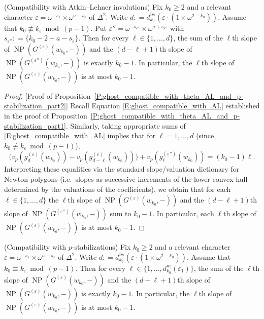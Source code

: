 \begin{proposition}
    \label{P:ghost_compatible_with_theta_AL_and_p-stabilization_part2}
    (Compatibility with Atkin--Lehner involutions)
    Fix $k_0 \geq 2$ and a relevant character $\varepsilon= \omega^{-s_\varepsilon} \times \omega^{a+s_\varepsilon}$ of $\Delta^2$. Write $d: = d_{k_0}^{\mathrm{Iw}}(\varepsilon\cdot (1\times \omega^{2-k_0}))$.
    Assume that ${k_0}\not \equiv k_\varepsilon \bmod{(p-1)}$.
    Put $\varepsilon'' = \omega^{-s_{\varepsilon''}} \times \omega^{a+s_{\varepsilon''}}$ with $s_{\varepsilon''}: = \{{k_0}-  2-a-s_\varepsilon\}$.  Then for every $\ell \in \{1, \dots, d\}$, the sum of the $\ell$th slope of ${\operatorname{NP}}(G^{(\varepsilon)}(w_{k_0}, -))$ and the $(d-\ell+1)$th slope of ${\operatorname{NP}}(G^{(\varepsilon'')}(w_{k_0}, -))$ is exactly ${k_0}-1$.
    In particular, the $\ell$th slope of ${\operatorname{NP}}(G^{(\varepsilon)}(w_{k_0}, -))$ is at most $k_0-1$.
\end{proposition}

\begin{proof}
    [Proof of Proposition~\ref{P:ghost_compatible_with_theta_AL_and_p-stabilization_part2}]
    Recall Equation \eqref{E:ghost_compatible_with_AL} established in the proof of Proposition~\ref{P:ghost_compatible_with_theta_AL_and_p-stabilization_part1}.
    Similarly, taking appropriate sums of \eqref{E:ghost_compatible_with_AL} implies that for $\ell = 1, \dots, d$ (since ${k_0} \not\equiv k_\varepsilon \bmod{(p-1)}$),
    $$
    \big(v_p(g^{(\varepsilon)}_d(w_{k_0})) - v_p(g^{(\varepsilon)}_{d-\ell}(w_{k_0})) \big) + v_p(g_\ell^{(\varepsilon'')}(w_{k_0})) = (k_0-1) \ell.
    $$
    Interpreting these equalities via the standard slope/valuation dictionary for Newton polygons (i.e.\ slopes as successive increments of the lower convex hull determined by the valuations of the coefficients), we obtain that for each $\ell\in\{1,\dots,d\}$ the $\ell$th slope of ${\operatorname{NP}}(G^{(\varepsilon)}(w_{k_0}, -))$ and the $(d-\ell+1)$th slope of ${\operatorname{NP}}(G^{(\varepsilon'')}(w_{k_0}, -))$ sum to ${k_0}-1$. In particular, each $\ell$th slope of ${\operatorname{NP}}(G^{(\varepsilon)}(w_{k_0}, -))$ is at most $k_0-1$.
\end{proof}

\begin{proposition}
    \label{P:ghost_compatible_with_theta_AL_and_p-stabilization_part3}
    (Compatibility with $p$-stabilizations)
    Fix $k_0 \geq 2$ and a relevant character $\varepsilon= \omega^{-s_\varepsilon} \times \omega^{a+s_\varepsilon}$ of $\Delta^2$. Write $d: = d_{k_0}^{\mathrm{Iw}}(\varepsilon\cdot (1\times \omega^{2-k_0}))$.
    Assume that ${k_0}\equiv k_\varepsilon \bmod {(p-1)}$. Then for every $\ell \in \{1, \dots, d_{k_0}^{\mathrm{ur}}(\varepsilon_1)\}$, the sum of the $\ell$th slope of ${\operatorname{NP}}(G^{(\varepsilon)}(w_{k_0}, -))$ and the $(d-\ell+1)$th slope of ${\operatorname{NP}}(G^{(\varepsilon)}(w_{k_0}, -))$ is exactly ${k_0}-1$.
    In particular, the $\ell$th slope of ${\operatorname{NP}}(G^{(\varepsilon)}(w_{k_0}, -))$ is at most ${k_0}-1$.
\end{proposition}

